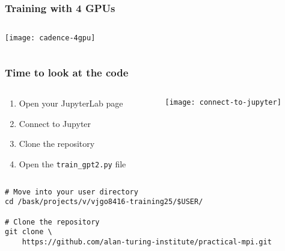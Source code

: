 \documentclass[
	notes=none,
	aspectratio=169
]{beamer}
\begin{document}

\begin{frame}
\frametitle{Training with 4 GPUs}

\begin{columns}[T]
\begin{column}[T]{1.0\textwidth}
\setlength{\parskip}{0.5em}

\vspace{0.0cm}
\texttt{[image: cadence-4gpu]}


\end{column}
\end{columns}

\end{frame}
\note{
}


\begin{frame}[fragile]
\frametitle{Time to look at the code}

\begin{columns}[T]
\begin{column}[T]{0.6\textwidth}
\setlength{\parskip}{0.5em}

\vspace{0.0cm}
\begin{enumerate}
\setlength{\parskip}{0.5em}
\item Open your JupyterLab page
\item Connect to Jupyter
\item Clone the repository
\item Open the {\tt train\_gpt2.py} file
\end{enumerate}

\end{column}
\begin{column}[T]{0.3\textwidth}
\setlength{\parskip}{0.5em}

\vspace{-0.5cm}
\texttt{[image: connect-to-jupyter]}

\end{column}
\end{columns}

\begin{lstlisting}[backgroundcolor = \color{darkgray},language=shell]
# Move into your user directory
cd /bask/projects/v/vjgo8416-training25/$USER/

# Clone the repository
git clone \
    https://github.com/alan-turing-institute/practical-mpi.git
\end{lstlisting}


\end{frame}
\note{
}
\end{document}
